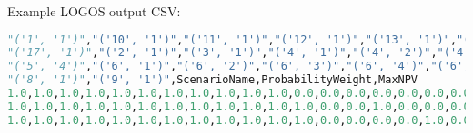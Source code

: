 Example LOGOS output CSV:
\begin{lstlisting}[basicstyle=\tiny,language=python]
"('1', '1')","('10', '1')","('11', '1')","('12', '1')","('13', '1')","('14', '1')","('15', '1')","('16', '1')",
"('17', '1')","('2', '1')","('3', '1')","('4', '1')","('4', '2')","('4', '3')","('5', '1')","('5', '2')","('5', '3')",
"('5', '4')","('6', '1')","('6', '2')","('6', '3')","('6', '4')","('6', '5')","('6', '6')","('6', '7')","('7', '1')",
"('8', '1')","('9', '1')",ScenarioName,ProbabilityWeight,MaxNPV
1.0,1.0,1.0,1.0,1.0,1.0,1.0,1.0,1.0,1.0,1.0,0.0,0.0,0.0,0.0,0.0,0.0,0.0,0.0,0.0,0.0,0.0,0.0,0.0,1.0,1.0,1.0,1.0,scenario_1,0.2,53.865
1.0,1.0,1.0,1.0,1.0,1.0,1.0,1.0,1.0,1.0,1.0,1.0,0.0,0.0,1.0,0.0,0.0,0.0,0.0,0.0,0.0,0.0,0.0,0.0,1.0,1.0,1.0,1.0,scenario_2,0.6,59.488
1.0,1.0,1.0,1.0,1.0,1.0,1.0,1.0,1.0,1.0,1.0,1.0,0.0,0.0,0.0,0.0,1.0,0.0,0.0,0.0,0.0,0.0,0.0,0.0,1.0,1.0,1.0,1.0,scenario_3,0.2,59.826

\end{lstlisting}
